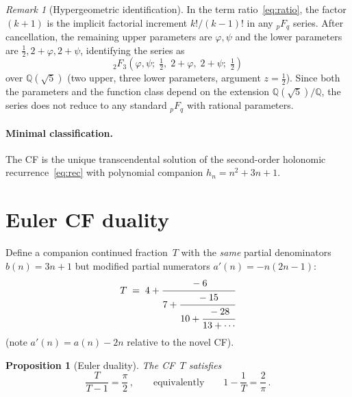 \documentclass[11pt]{article}
\newcommand{\half}{\tfrac{1}{2}}
\newtheorem{proposition}[theorem]{Proposition}
\theoremstyle{remark}
\newtheorem{remark}[theorem]{Remark}
\begin{document}
\begin{remark}[Hypergeometric identification]\label{rem:2f3}
In the term ratio~\eqref{eq:ratio}, the factor $(k{+}1)$ is the
implicit factorial increment $k!/(k{-}1)!$ in any ${}_pF_q$ series.
After cancellation, the remaining upper parameters are $\varphi,\psi$
and the lower parameters are $\half, 2{+}\varphi, 2{+}\psi$,
identifying the series as
\[
  {}_2F_3\!\left(\varphi,\psi;\;\half,\;2{+}\varphi,\;2{+}\psi;\;
  \half\right)
\]
over $\mathbb{Q}(\sqrt5)$ (two upper, three lower parameters, argument
$z = \half$).  Since both the parameters and the function class
depend on the extension $\mathbb{Q}(\sqrt5)/\mathbb{Q}$, the series
does not reduce to any standard ${}_pF_q$ with rational parameters.
\end{remark}

\paragraph{Minimal classification.}
The CF is the unique transcendental solution of the
second-order holonomic recurrence~\eqref{eq:rec} with polynomial
companion $h_n = n^2+3n+1$.


\section{Euler CF duality}\label{sec:euler}

Define a companion continued fraction~$T$ with the \emph{same}
partial denominators $b(n) = 3n{+}1$ but modified partial numerators
$a'(n) = -n(2n{-}1)$:
\[
  T \;=\; 4 + \cfrac{-6}{7 + \cfrac{-15}{10 + \cfrac{-28}{13 + \cdots}}}
\]
(note $a'(n) = a(n) - 2n$ relative to the novel CF).

\begin{proposition}[Euler duality]\label{prop:euler}
The CF~$T$ satisfies
\[
  \frac{T}{T-1} = \frac{\pi}{2}\,,
  \qquad\text{equivalently}\qquad
  1 - \frac{1}{T} = \frac{2}{\pi}\,.
\]
\end{proposition}
\end{document}
